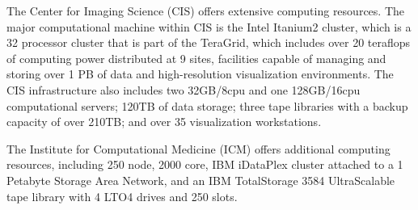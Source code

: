 \documentclass[11pt]{nih}
\begin{document}


% 
The Center for Imaging Science (CIS) offers extensive computing resources. The major computational machine within CIS is the Intel Itanium2 cluster, which is a 32 processor cluster that is part of the TeraGrid, which includes over 20 teraflops of computing power distributed at 9 sites, facilities capable of managing and storing over 1 PB of data and high-resolution visualization environments. The CIS infrastructure also includes two 32GB/8cpu and one 128GB/16cpu computational servers; 120TB of data storage; three tape libraries with a backup capacity of over 210TB; and over 35 visualization workstations.

% 
The Institute for Computational Medicine (ICM) offers additional computing resources, including 250 node, 2000 core, IBM iDataPlex cluster attached to a 1 Petabyte Storage Area Network, and an IBM TotalStorage 3584 UltraScalable tape library with 4 LTO4 drives and 250 slots.

\end{document}
